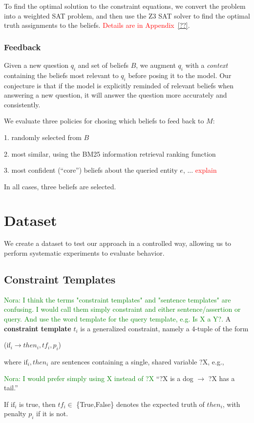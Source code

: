 \documentclass[11pt]{article}
\newcommand{\nk}[1]{\textcolor{green}{Nora: #1}}
\newcommand{\red}[1]{\textcolor{red}{#1}}
\newenvironment{myquote}{                   %
  \parskip 0mm \begin{quoting}[vskip=0mm,leftmargin=2mm]}{
\end{quoting}}
\newenvironment{enu}{                   %
     \parskip 0cm \begin{list}{}{\parsep 0cm \itemsep 0cm \topsep 0cm}}{
       \end{list}} %
\begin{document}
To find the optimal solution to the constraint equations, we convert the problem into a weighted SAT problem,
and then use the Z3 SAT solver to find the optimal truth assignments to the beliefs. \red{Details are in
Appendix~\ref{??}}.

\subsubsection{Feedback}

Given a new question $q_i$ and set of beliefs $B$, we augment
$q_i$ with a {\it context} containing the beliefs most relevant to $q_i$
before posing it to the model. Our conjecture is that if the 
model is explicitly reminded of relevant beliefs when answering a new question,
it will answer the question more accurately and consistently.

We evaluate three policies for chosing which beliefs to feed back to $M$:
\begin{enu}
\item[1.] randomly selected from $B$
\item[2.] most similar, using the BM25 information retrieval ranking function \cite{bm25}
\item[3.] most confident (``core'') beliefs about the queried entity $e$, ... \red{explain}
\end{enu}
In all cases, three beliefs are selected.

\section{Dataset}

We create a dataset to test our approach in a controlled way, allowing us to perform systematic experiments to evaluate behavior.

\subsection{Constraint Templates}
\nk{I think the terms "constraint templates" and "sentence templates" are confusing. I would call them simply constraint and either sentence/assertion or query. And use the word template for the query template, e.g. Is X a Y?.}
A {\bf constraint template} $t_i$ is a generalized constraint, namely a 4-tuple of the form
\begin{myquote} \centering
($\textrm{if}_i \rightarrow then_i, tf_i, p_i$)
\end{myquote} 
where $\textrm{if}_i, then_i$ are sentences containing a single, shared variable ?X, e.g.,
\begin{myquote} \centering
\nk{I would prefer simply using X instead of ?X}
``?X is a dog $\rightarrow$ ?X has a tail.''
\end{myquote}
If $\textrm{if}_i$ is true, then $tf_i \in$ \{True,False\} denotes the expected truth of $then_i$, 
with penalty $p_i$ if it is not.
\end{document}
